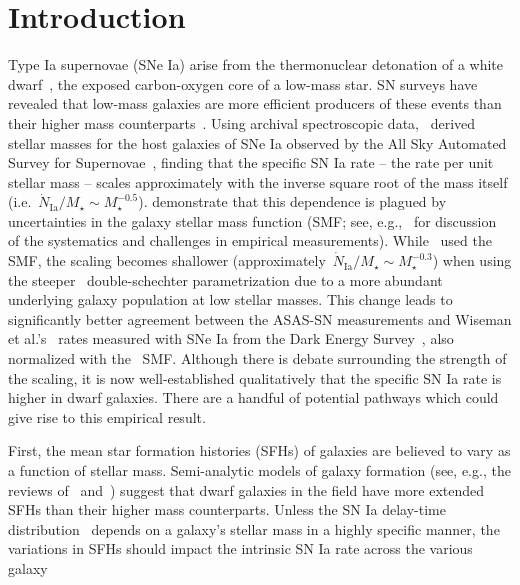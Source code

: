 \documentclass[ms.tex]{subfiles}
\begin{document}
\section{Introduction}
\label{sec:intro}

Type Ia supernovae (SNe Ia) arise from the thermonuclear detonation of a white
dwarf~\citep[WD;][]{Hoyle1960, Colgate1969}, the exposed carbon-oxygen core of
a low-mass star.
SN surveys have revealed that low-mass galaxies are more efficient producers
of these events than their higher mass counterparts~\citep[e.g.][]{Mannucci2005,
Sullivan2006, Smith2012}.
Using archival spectroscopic data,~\citet{Brown2019} derived stellar masses for
the host galaxies of SNe Ia observed by the All Sky Automated Survey for
Supernovae~\citep[ASAS-SN;][]{Shappee2014, Kochanek2017}, finding that the
specific SN Ia rate -- the rate per unit stellar mass -- scales approximately
with the inverse square root of the mass itself (i.e.~$\dot{N}_\text{Ia} /
M_\star \sim M_\star^{-0.5}$).
\citet{Gandhi2022} demonstrate that this dependence is plagued by uncertainties
in the galaxy stellar mass function (SMF; see, e.g.,~\citealp*{Weigel2016} for
discussion of the systematics and challenges in empirical measurements).
While~\citet{Brown2019} used the~\citet{Bell2003} SMF, the scaling becomes
shallower (approximately~$\dot{N}_\text{Ia} / M_\star \sim M_\star^{-0.3}$)
when using the steeper~\citet{Baldry2012} double-schechter parametrization due
to a more abundant underlying galaxy population at low stellar masses.
This change leads to significantly better agreement between the ASAS-SN
measurements and Wiseman et al.'s~\citeyearpar{Wiseman2021} rates measured with
SNe Ia from the Dark Energy Survey~\citep[DES;][]{DES2016}, also normalized
with the~\citet{Baldry2012} SMF.
Although there is debate surrounding the strength of the scaling, it is now
well-established qualitatively that the specific SN Ia rate is higher in dwarf
galaxies.
There are a handful of potential pathways which could give rise to this
empirical result.
\par
First, the mean star formation histories (SFHs) of galaxies are believed to
vary as a function of stellar mass. Semi-analytic models of galaxy formation
(see, e.g., the reviews of~\citealp{Baugh2006} and~\citealp{Somerville2015a})
suggest that dwarf galaxies in the field have more extended SFHs than their
higher mass counterparts.
Unless the SN Ia delay-time distribution~\citep[DTD; e.g.,][]{Maoz2012a}
depends on a galaxy's stellar mass in a highly specific manner, the variations
in SFHs should impact the intrinsic SN Ia rate across the various galaxy
\end{document}
